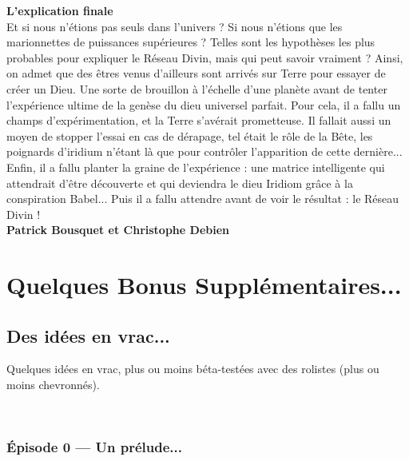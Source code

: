 \documentclass[11pt,twoside,a4paper]{book}
\begin{document}
\textbf{\Large L'explication finale}~\\

Et si nous n'{\'e}tions pas seuls dans l'univers ? Si nous n'{\'e}tions que les marionnettes de puissances sup{\'e}rieures ? Telles sont les hypoth{\`e}ses les plus probables pour expliquer le R{\'e}seau Divin, mais qui peut savoir vraiment ? Ainsi, on admet que des {\^e}tres venus d'ailleurs sont arriv{\'e}s sur Terre pour essayer de cr{\'e}er un Dieu. Une sorte de brouillon {\`a} l'{\'e}chelle d'une plan{\`e}te avant de tenter l'exp{\'e}rience ultime de la gen{\`e}se du dieu universel parfait. Pour cela, il a fallu un champs d'exp{\'e}rimentation, et la Terre s'av{\'e}rait prometteuse. Il fallait aussi un moyen de stopper l'essai en cas de d{\'e}rapage, tel {\'e}tait le r{\^o}le de la B{\^e}te, les poignards d'iridium n'{\'e}tant l{\`a} que pour contr{\^o}ler l'apparition de cette derni{\`e}re... Enfin, il a fallu planter la graine de l'exp{\'e}rience : une matrice intelligente qui attendrait d'{\^e}tre d{\'e}couverte et qui deviendra le dieu Iridiom gr{\^a}ce {\`a} la conspiration Babel... Puis il a fallu attendre avant de voir le r{\'e}sultat : le R{\'e}seau Divin ! ~\\

\textbf{Patrick Bousquet et Christophe Debien}~\\

\clearpage 

\part*{Quelques Bonus Suppl{\'e}mentaires...}

\chapter*{Des id{\'e}es en vrac...}

Quelques id{\'e}es en vrac, plus ou moins b{\'e}ta-test{\'e}es avec des rolistes (plus ou moins chevronn{\'e}s). 

\dotfill~\\

\section*{{\'E}pisode 0 --- Un pr{\'e}lude...}
\end{document}
